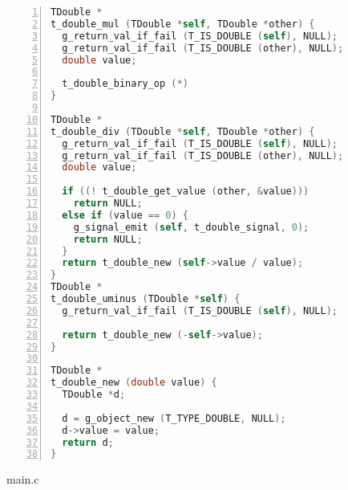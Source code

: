\begin{lstlisting}[language=C, numbers=left]
TDouble *
t_double_mul (TDouble *self, TDouble *other) {
  g_return_val_if_fail (T_IS_DOUBLE (self), NULL);
  g_return_val_if_fail (T_IS_DOUBLE (other), NULL);
  double value;

  t_double_binary_op (*)
}

TDouble *
t_double_div (TDouble *self, TDouble *other) {
  g_return_val_if_fail (T_IS_DOUBLE (self), NULL);
  g_return_val_if_fail (T_IS_DOUBLE (other), NULL);
  double value;

  if ((! t_double_get_value (other, &value)))
    return NULL;
  else if (value == 0) {
    g_signal_emit (self, t_double_signal, 0);
    return NULL;
  }
  return t_double_new (self->value / value);
}
TDouble *
t_double_uminus (TDouble *self) {
  g_return_val_if_fail (T_IS_DOUBLE (self), NULL);

  return t_double_new (-self->value);
}

TDouble *
t_double_new (double value) {
  TDouble *d;

  d = g_object_new (T_TYPE_DOUBLE, NULL);
  d->value = value;
  return d;
}
\end{lstlisting}

main.c


